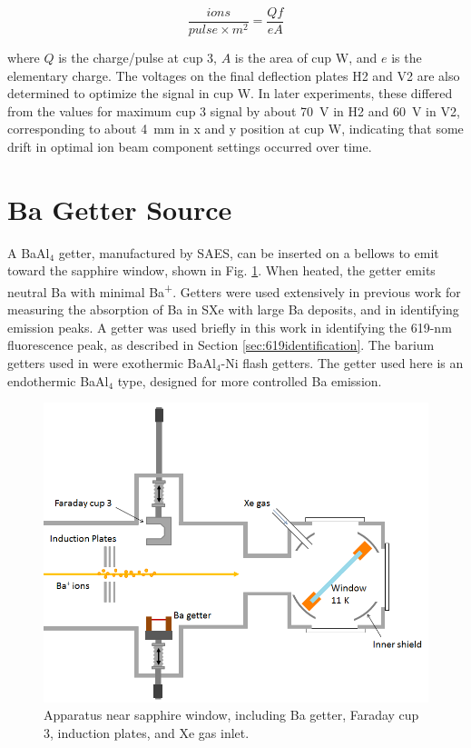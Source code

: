 \begin{equation}
\frac{ions}{pulse \times m^{2}} = \frac{Q f}{e A}
\label{eqn:ion_density}
\end{equation}

\noindent
where $Q$ is the charge/pulse at cup 3, $A$ is the area of cup W, and $e$ is the elementary charge.  The voltages on the final deflection plates H2 and V2 are also determined to optimize the signal in cup W.  In later experiments, these differed from the values for maximum cup 3 signal by about 70~V in H2 and 60~V in V2, corresponding to about 4~mm in x and y position at cup W, indicating that some drift in optimal ion beam component settings occurred over time.

\section{Ba Getter Source}

A BaAl$_{4}$ getter, manufactured by SAES, can be inserted on a bellows to emit toward the sapphire window, shown in Fig. \ref{fig:endOfBeamBa}.  When heated, the getter emits neutral Ba with minimal Ba\textsuperscript{+}.  Getters were used extensively in previous work \cite{Brian} for measuring the absorption of Ba in SXe with large Ba deposits, and in identifying emission peaks.  A getter was used briefly in this work in identifying the 619-nm fluorescence peak, as described in Section \ref{sec:619identification}.  The barium getters used in \cite{Brian} were exothermic BaAl$_{4}$-Ni flash getters.  The getter used here is an endothermic BaAl$_{4}$ type, designed for more controlled Ba emission.  


\begin{figure} %
        \centering
                \includegraphics[width=.75\textwidth]{figures/window_etc_justBa.png}
                \caption{Apparatus near sapphire window, including Ba getter, Faraday cup 3, induction plates, and Xe gas inlet.}
\label{fig:endOfBeamBa}
\end{figure}

